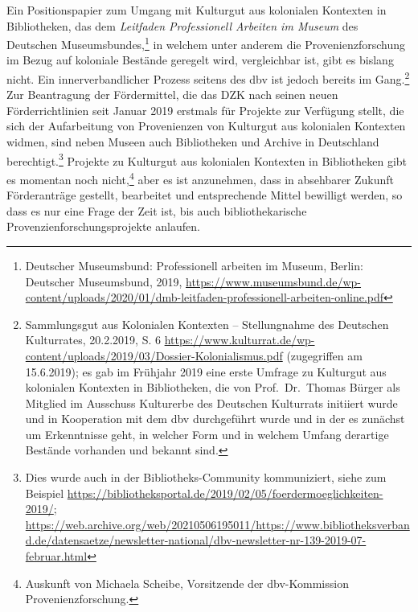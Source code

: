 \documentclass[a4paper,
fontsize=11pt,
oneside,
numbers=noperiodatend,
parskip=half-,
bibliography=totoc,
final
]{scrartcl}
\begin{document}
Ein Positionspapier zum Umgang mit Kulturgut aus kolonialen Kontexten in
Bibliotheken, das dem \emph{Leitfaden Professionell Arbeiten im Museum}
des Deutschen Museumsbundes,\footnote{Deutscher Museumsbund:
  Professionell arbeiten im Museum, Berlin: Deutscher Museumsbund, 2019,
  \url{https://www.museumsbund.de/wp-content/uploads/2020/01/dmb-leitfaden-professionell-arbeiten-online.pdf}}
in welchem unter anderem die Provenienzforschung im Bezug auf koloniale
Bestände geregelt wird, vergleichbar ist, gibt es bislang nicht. Ein
innerverbandlicher Prozess seitens des dbv ist jedoch bereits im
Gang.\footnote{Sammlungsgut aus Kolonialen Kontexten -- Stellungnahme des
  Deutschen Kulturrates, 20.2.2019, S. 6
  \url{https://www.kulturrat.de/wp-content/uploads/2019/03/Dossier-Kolonialismus.pdf}
  (zugegriffen am 15.6.2019); es gab im Frühjahr 2019 eine erste Umfrage
  zu Kulturgut aus kolonialen Kontexten in Bibliotheken, die von
  Prof.~Dr.~Thomas Bürger als Mitglied im Ausschuss Kulturerbe des
  Deutschen Kulturrats initiiert wurde und in Kooperation mit dem dbv
  durchgeführt wurde und in der es zunächst um Erkenntnisse geht, in
  welcher Form und in welchem Umfang derartige Bestände vorhanden und
  bekannt sind.} Zur Beantragung der Fördermittel, die das DZK nach
seinen neuen Förderrichtlinien seit Januar 2019 erstmals für Projekte
zur Verfügung stellt, die sich der Aufarbeitung von Provenienzen von
Kulturgut aus kolonialen Kontexten widmen, sind neben Museen auch
Bibliotheken und Archive in Deutschland berechtigt.\footnote{Dies wurde
  auch in der Bibliotheks-Community kommuniziert, siehe zum Beispiel
  \url{https://bibliotheksportal.de/2019/02/05/foerdermoeglichkeiten-2019/};
  \url{https://web.archive.org/web/20210506195011/https://www.bibliotheksverband.de/datensaetze/newsletter-national/dbv-newsletter-nr-139-2019-07-februar.html}}
Projekte zu Kulturgut aus kolonialen Kontexten in Bibliotheken gibt es
momentan noch nicht,\footnote{Auskunft von Michaela Scheibe, Vorsitzende
  der dbv-Kommission Provenienzforschung.} aber es ist anzunehmen, dass
in absehbarer Zukunft Förderanträge gestellt, bearbeitet und
entsprechende Mittel bewilligt werden, so dass es nur eine Frage der
Zeit ist, bis auch bibliothekarische Provenzienforschungsprojekte
anlaufen.
\end{document}
